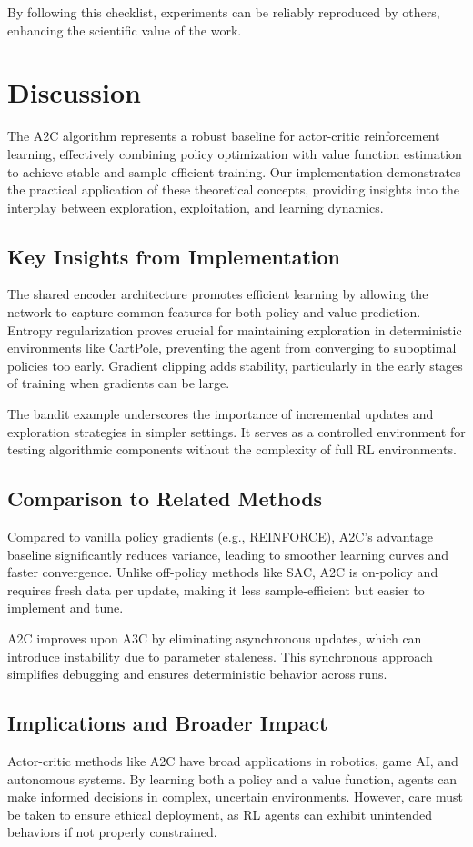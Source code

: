 \documentclass[11pt]{article}
\begin{document}
By following this checklist, experiments can be reliably reproduced by others, enhancing the scientific value of the work.
\section{Discussion}
The A2C algorithm represents a robust baseline for actor-critic reinforcement learning, effectively combining policy optimization with value function estimation to achieve stable and sample-efficient training. Our implementation demonstrates the practical application of these theoretical concepts, providing insights into the interplay between exploration, exploitation, and learning dynamics.

\subsection{Key Insights from Implementation}
The shared encoder architecture promotes efficient learning by allowing the network to capture common features for both policy and value prediction. Entropy regularization proves crucial for maintaining exploration in deterministic environments like CartPole, preventing the agent from converging to suboptimal policies too early. Gradient clipping adds stability, particularly in the early stages of training when gradients can be large.

The bandit example underscores the importance of incremental updates and exploration strategies in simpler settings. It serves as a controlled environment for testing algorithmic components without the complexity of full RL environments.

\subsection{Comparison to Related Methods}
Compared to vanilla policy gradients (e.g., REINFORCE), A2C's advantage baseline significantly reduces variance, leading to smoother learning curves and faster convergence. Unlike off-policy methods like SAC, A2C is on-policy and requires fresh data per update, making it less sample-efficient but easier to implement and tune.

A2C improves upon A3C by eliminating asynchronous updates, which can introduce instability due to parameter staleness. This synchronous approach simplifies debugging and ensures deterministic behavior across runs.

\subsection{Implications and Broader Impact}
Actor-critic methods like A2C have broad applications in robotics, game AI, and autonomous systems. By learning both a policy and a value function, agents can make informed decisions in complex, uncertain environments. However, care must be taken to ensure ethical deployment, as RL agents can exhibit unintended behaviors if not properly constrained.
\end{document}
